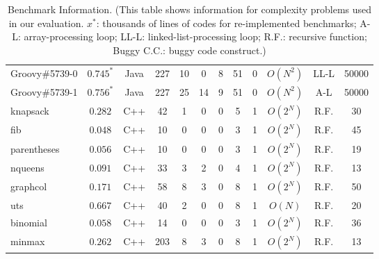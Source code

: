 \begin{table}[h!]
\begin{tabular}{lccccccccccc}
    \midrule
    Groovy\#5739-0        & $0.745^*$  & Java  & 227 & 10 & 0 & 8 & 51 & 0                                                & $O(N^{2})$ & LL-L& 50000 \\
    Groovy\#5739-1        & $0.756^*$  & Java  &227  & 25 &  14 & 9 & 51 & 0                                              & $O(N^{2})$ & A-L & 50000 \\
    \midrule
    \midrule
    knapsack      &  $0.282$  & C++  & 42 & 1 & 0 & 0 & 5 & 1                                                                            & $O(2^{N})$ & R.F. & 30  \\
    fib      &  $0.048$ & C++  & 10 & 0 & 0 & 0 & 3 & 1                                                                                  & $O(2^{N})$ & R.F. & 45 \\
    parentheses      & $0.056$   & C++  & 10 & 0 & 0 & 0 & 3 & 1                                                                         & $O(2^{N})$ & R.F. & 19 \\
    nqueens      & $0.091$  & C++  & 33 & 3 & 2 & 0 & 4 & 1                                                                              & $O(2^{N})$ & R.F. & 13 \\
    graphcol      &  $0.171$  & C++  & 58 & 8 & 3 & 0 & 8 & 1                                                                            & $O(2^{N})$ & R.F. & 50 \\
    uts      &  $0.667$  & C++  & 40  & 2 & 0 & 0 & 8 & 1                                                                                & $O(N)$     & R.F. & 20 \\
    binomial      &  $0.058$  & C++  & 14 & 0 & 0 & 0 & 3 & 1                                                                            & $O(2^{N})$ & R.F. & 36 \\
    minmax      &  $0.262$  & C++  & 203 & 8 & 3 & 0 & 8 & 1                                                                             & $O(2^{N})$ & R.F. & 13 \\


    \bottomrule
   \end{tabular}
  \caption{Benchmark Information.
  \footnotesize{(This table shows information for complexity problems used in our evaluation. 
   $x^*$: thousands of lines of codes for re-implemented benchmarks; 
   A-L: array-processing loop; 
   LL-L: linked-list-processing loop; 
   R.F.: recursive function; 
   Buggy C.C.: buggy code construct.)}}
  \label{tab:benchmark_info}
\end{table}